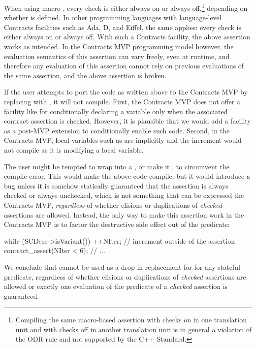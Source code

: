 When using macro , every check is either always on or always off,\footnote{Compiling the same macro-based assertion with checks on in one translation unit and with checks off in another translation unit is in general a violation of the ODR rule and not supported by the C++ Standard.} depending on whether  is defined. In other programming languages with language-level Contracts facilities such as Ada, D, and Eiffel, the same applies: every check is either always on or always off. With such a Contracts facility, the above assertion works as intended. In the Contracts MVP programming model however, the evaluation semantics of this assertion can vary freely, even at runtime, and therefore any evaluation of this assertion cannot rely on previous evaluations of the same assertion, and the above assertion is broken.

If the user attempts to port the code as written above to the Contracts MVP by replacing  with , it will not compile. First, the Contracts MVP does not offer a facility like  for conditionally declaring a variable only when the associated contract assertion is checked. However, it is plausible that we would add a facility as a post-MVP extension to conditionally enable such code. Second, in the Contracts MVP, local variables such as  are implicitly  and the increment would not compile as it is modifying a local variable.

The user might be tempted to wrap  into a , or make it , to circumvent the compile error. This would make the above code compile, but it would introduce a bug unless it is somehow statically guaranteed that the assertion is always checked or always unchecked, which is not something that can be expressed the Contracts MVP, \emph{regardless} of whether elisions or duplications of \emph{checked} assertions are allowed. Instead, the only way to make this assertion work in the Contracts MVP is to factor the destructive side effect out of the predicate:
\begin{codeblock}
  while (SCDesc->isVariant()) {
    ++NIter; // increment outside of the assertion
    contract_assert(NIter < 6); 
    // ...
  }
\end{codeblock}
We conclude that  cannot be used as a drop-in replacement for  for any stateful predicate, regardless of whether elisions or duplications of \emph{checked} assertions are allowed or exactly one evaluation of the predicate of a \emph{checked} assertion is guaranteed.

